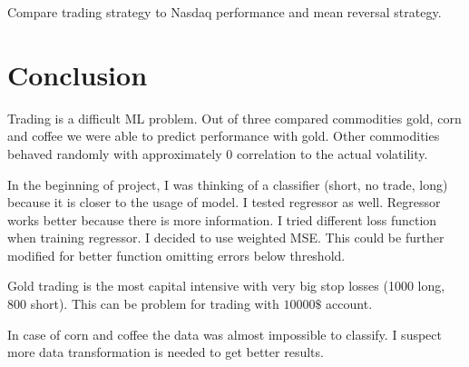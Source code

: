 \documentclass[final,2p]{elsarticle}
\begin{document}
Compare trading strategy to Nasdaq performance and mean reversal strategy.

\section{Conclusion}

Trading is a difficult ML problem. Out of three compared commodities gold, corn and coffee we were able to predict performance with gold. Other commodities behaved randomly with approximately 0 correlation to the actual volatility.

In the beginning of project, I was thinking of a classifier (short, no trade, long) because it is closer to the usage of model. I tested regressor as well. Regressor works better because there is more information. I tried different loss function when training regressor. I decided to use weighted MSE. This could be further modified for better function omitting errors below threshold.

Gold trading is the most capital intensive with very big stop losses (1000 long, 800 short). This can be problem for trading with $10 000\$$ account.

In case of corn and coffee the data was almost impossible to classify. I suspect more data transformation is needed to get better results.
\end{document}
